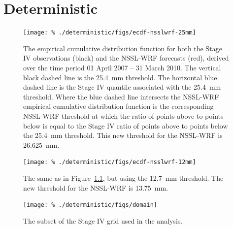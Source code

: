 

\chapter{Deterministic}
\label{deterministic}









\clearpage
\begin{figure}[cc]
    \centering
    \texttt{[image: \%
    ./deterministic/figs/ecdf-nsslwrf-25mm]}\\
    \caption{The empirical cumulative distribution function for both the Stage IV observations (black) and the NSSL-WRF forecasts (red), derived over the time period 01 April 2007 -- 31 March 2010.
    The vertical black dashed line is the \mbox{25.4 mm} threshold.
    The horizontal blue dashed line is the Stage IV quantile associated with the \mbox{25.4 mm} threshold.
    Where the blue dashed line intersects the NSSL-WRF empirical cumulative distribution function is the corresponding NSSL-WRF threshold at which the ratio of points above to points below is equal to the Stage IV ratio of points above to points below the \mbox{25.4 mm} threshold.
    This new threshold for the NSSL-WRF is \mbox{26.625 mm}.}
    \label{single_25quant}
\end{figure}


\clearpage
\begin{figure}[cc]
    \centering
    \texttt{[image: \%
    ./deterministic/figs/ecdf-nsslwrf-12mm]}\\
    \caption{The same as in \mbox{Figure \ref{single_25quant}}, but using the \mbox{12.7 mm} threshold.
    The new threshold for the NSSL-WRF is \mbox{13.75 mm}.}
    \label{single_12quant}
\end{figure}


\clearpage
\begin{figure}[cc]
    \centering
    \texttt{[image: \%
    ./deterministic/figs/domain]}\\
    \caption{The subset of the Stage IV grid used in the analysis.}
    \label{domain}
\end{figure}


